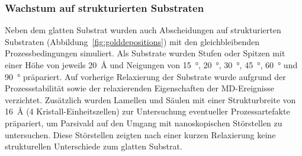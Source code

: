 \subsubsection{Wachstum auf strukturierten Substraten}

Neben dem glatten Substrat wurden auch Abscheidungen auf strukturierten Substraten (Abbildung~\ref{fig:golddepositions}) mit den gleichbleibenden Prozessbedingungen simuliert.
Als Substrate wurden Stufen oder Spitzen mit einer Höhe von jeweils \SI{20}{\angstrom} und Neigungen von \SI{15}{\degree}, \SI{20}{\degree}, \SI{30}{\degree}, \SI{45}{\degree}, \SI{60}{\degree} und \SI{90}{\degree} präpariert.
Auf vorherige Relaxierung der Substrate wurde aufgrund der Prozessstabilität sowie der relaxierenden Eigenschaften der MD-Ereignisse verzichtet.
Zusätzlich wurden Lamellen und Säulen mit einer Strukturbreite von \SI{16}{\angstrom} (4 Kristall-Einheitszellen) zur Untersuchung eventueller Prozessartefakte präpariert, um Parsivald auf den Umgang mit nanoskopischen Störstellen zu untersuchen.
Diese Störstellen zeigten nach einer kurzen Relaxierung keine strukturellen Unterschiede zum glatten Substrat.

